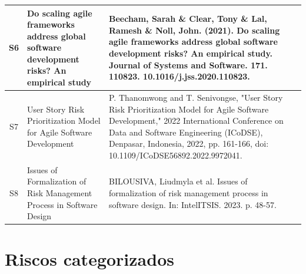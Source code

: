 \documentclass[
	12pt,
	openright,
	twoside,
	a4paper,
	english,
	brazil
	]{abntex2}
\begin{document}
\begin{longtable}{|c|p{5.5cm}|p{7.5cm}|}
  \hline
  S6 & Do scaling agile frameworks address global software development risks? An empirical study & Beecham, Sarah \& Clear, Tony \& Lal, Ramesh \& Noll, John. (2021). Do scaling agile frameworks address global software development risks? An empirical study. Journal of Systems and Software. 171. 110823. 10.1016/j.jss.2020.110823. \\
  \hline
  S7 & User Story Risk Prioritization Model for Agile Software Development & P. Thanomwong and T. Senivongse, "User Story Risk Prioritization Model for Agile Software Development," 2022 International Conference on Data and Software Engineering (ICoDSE), Denpasar, Indonesia, 2022, pp. 161-166, doi: 10.1109/ICoDSE56892.2022.9972041. \\
  \hline
  S8 & Issues of Formalization of Risk Management Process in Software Design & BILOUSIVA, Liudmyla et al. Issues of formalization of risk management process in software design. In: IntelITSIS. 2023. p. 48-57. \\
  \hline
\end{longtable}

\chapter{Riscos categorizados}
\label{apendiceC}

\vspace{-2em} %

\end{document}
